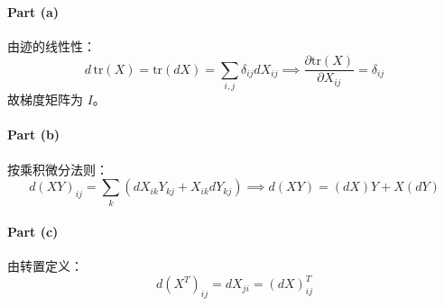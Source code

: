 \paragraph{Part (a)}  
由迹的线性性：
\[
d\,\text{tr}(X) = \text{tr}(dX) = \sum_{i,j} \delta_{ij} dX_{ij} \implies \frac{\partial \text{tr}(X)}{\partial X_{ij}} = \delta_{ij}
\]
故梯度矩阵为 \(I\)。

\paragraph{Part (b)}  
按乘积微分法则：
\[
d(XY)_{ij} = \sum_k (dX_{ik}Y_{kj} + X_{ik}dY_{kj}) \implies d(XY) = (dX)Y + X(dY)
\]

\paragraph{Part (c)}  
由转置定义：
\[
d(X^T)_{ij} = dX_{ji} = (dX)^T_{ij}
\]